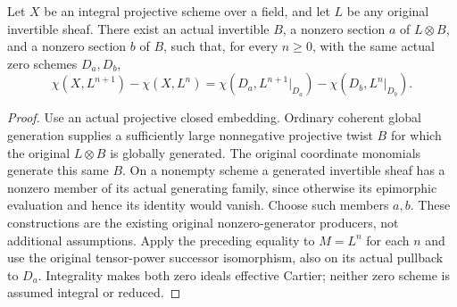 \begin{lemma}
\label{lem:seshadri-arbitrary-power-cut-difference}
\leanok
Let $X$ be an integral projective scheme over a field, and let $L$ be any
original invertible sheaf. There exist an actual invertible $B$, a nonzero
section $a$ of $L\otimes B$, and a nonzero section $b$ of $B$, such that,
for every $n\geq0$, with the same actual zero schemes $D_a,D_b$,
\[
 \chi(X,L^{n+1})-\chi(X,L^n)
 =\chi(D_a,L^{n+1}|_{D_a})-\chi(D_b,L^n|_{D_b}).
\]
\end{lemma}
\begin{proof}
Use an actual projective closed embedding. Ordinary coherent global
generation supplies a sufficiently large nonnegative projective twist
$B$ for which the original $L\otimes B$ is globally generated. The
original coordinate monomials generate this same $B$. On a nonempty
scheme a generated invertible sheaf has a nonzero member of its actual
generating family, since otherwise its epimorphic evaluation and hence
its identity would vanish. Choose such members $a,b$. These constructions
are the existing original nonzero-generator producers, not additional
assumptions. Apply the preceding equality to $M=L^n$ for each $n$ and use
the original tensor-power successor isomorphism, also on its actual
pullback to $D_a$. Integrality makes both zero ideals effective Cartier;
neither zero scheme is assumed integral or reduced.
\end{proof}

